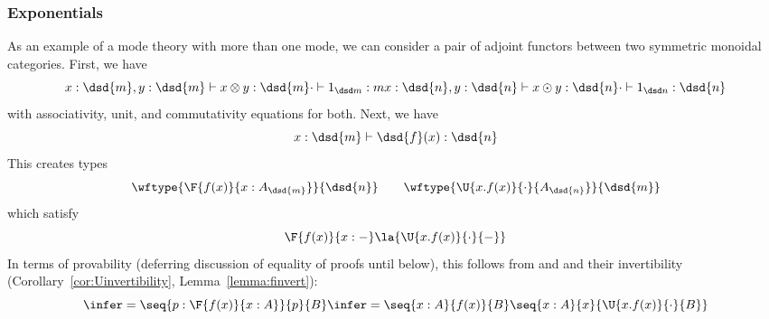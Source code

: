 \subsubsection{Exponentials}  As an example of a mode theory with more
than one mode, we can consider a pair of adjoint functors between two
symmetric monoidal categories.  First, we have
\[
x  : \dsd{m}, y  : \dsd{m} \vdash x \otimes y : \dsd{m} \\
\cdot \vdash 1_{\dsd m} : m \\
x  : \dsd{n}, y  : \dsd{n} \vdash x \odot y : \dsd{n} \\
\cdot \vdash 1_{\dsd n} : \dsd{n} \\
\]
with associativity, unit, and commutativity equations for both.  
Next, we have
\[
x : \dsd{m} \vdash \dsd{f}(x) : \dsd{n}
\]
This creates types 
\[
\wftype {\F{f(x)}{x : A_{\dsd{m}}}}{\dsd{n}}
\qquad
\wftype {\U{x.f(x)}{\cdot}{A_{\dsd{n}}}}{\dsd{m}}
\]
which satisfy
\[
\F{f(x)}{x:-} \la {\U{x.f(x)}{\cdot}{-}}
\]
In terms of provability (deferring discussion of equality of proofs
until below), this follows from \FL\/ and \FR\/ and their invertibility
(Corollary~\ref{cor:Uinvertibility}, Lemma~\ref{lemma:finvert}):
\[
\infer={\seq{p:\F{f(x)}{x:A}}{p}{B}}
       {\infer={\seq{x:A}{f(x)}{B}}
               {\seq{x:A}{x}{\U{x.f(x)}{\cdot}{B}}}}
\]

